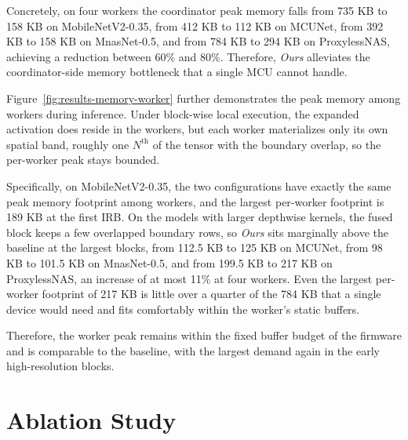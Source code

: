 Concretely, on four workers the coordinator peak memory falls from 735 KB to 158 KB on MobileNetV2-0.35, from 412 KB to 112 KB on MCUNet, from 392 KB to 158 KB on MnasNet-0.5, and from 784 KB to 294 KB on ProxylessNAS, achieving a reduction between 60\% and 80\%. Therefore, \emph{Ours} alleviates the coordinator-side memory bottleneck that a single MCU cannot handle.

Figure~\ref{fig:results-memory-worker} further demonstrates the peak memory among workers during inference.
Under block-wise local execution, the expanded activation does reside in the
workers, but each worker materializes only its own spatial band, roughly one
$N^{\mathrm{th}}$ of the tensor with the boundary overlap, so the per-worker peak stays
bounded.

Specifically, on MobileNetV2-0.35, the two configurations have exactly the same peak memory footprint among workers, and the largest per-worker footprint is 189 KB at the first IRB.
On the models with larger depthwise kernels, the fused block keeps a few overlapped boundary rows, so \emph{Ours} sits marginally above the baseline at the largest blocks, from 112.5 KB to 125 KB on MCUNet, from 98 KB to 101.5 KB on MnasNet-0.5, and from 199.5 KB to 217 KB on ProxylessNAS, an increase of at most 11\% at four workers. Even the largest per-worker footprint of 217 KB is little over a quarter of the 784 KB that a single device would need and fits comfortably within the worker's static buffers.

Therefore, the worker peak remains within the fixed buffer budget
of the firmware and is comparable to the baseline, with the largest demand
again in the early high-resolution blocks.







\section{Ablation Study}
\label{sec:eval-ablation-study}




